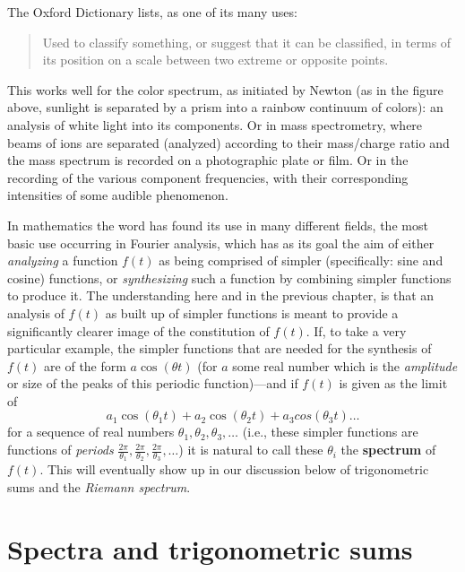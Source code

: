 \documentclass[openany]{book}
\theoremstyle{plain}
\theoremstyle{definition}
\begin{document}
{  The Oxford Dictionary lists, as one of its many uses:

\begin{quote} Used to classify something, or suggest that it can be classified, in terms of its position on a scale between two extreme or opposite points.\end{quote}

This works well for the color spectrum, as initiated by Newton (as in the figure above, sunlight is separated by a prism into a rainbow  continuum of colors): an analysis of white light into its components. Or in mass spectrometry, where
 beams of ions are separated (analyzed) according to their
mass/charge ratio and the mass spectrum is recorded on a photographic plate or film.  Or in the recording of the various component frequencies, with their  corresponding intensities of some audible phenomenon.

 In mathematics the word  has found its use in many different fields, the most basic use occurring in Fourier analysis, which has as its goal the aim of either {\it analyzing}  a function $f(t)$ as being  comprised of simpler (specifically: sine and cosine) functions, or {\it synthesizing} such a function by combining simpler functions to produce it. The understanding here and in the previous chapter, is that  an analysis of $f(t)$ as built up of simpler functions is meant to provide a significantly clearer image of the constitution of $f(t)$.  If, to take a very particular example, the simpler functions  that are needed for the synthesis of $f(t)$ are of the form $a\cos(\theta t)$  (for $a$ some real number which is the {\it amplitude} or size of the peaks of this periodic function)---and  if $f(t)$ is given as the limit of $$a_1\cos(\theta_1t) +  a_2\cos(\theta_2t) + a_3cos(\theta_3t) \dots$$  for a sequence of real numbers $\theta_1, \theta_2,
 \theta_3,
 \dots$  (i.e., these simpler functions are functions of {\it periods} ${\frac{2\pi}{\theta_1}}, {\frac{2\pi}{\theta_2}}, {\frac{2\pi}{\theta_3}}, \dots$) it is natural to call these $\theta_i$ the  {\bf spectrum} of $f(t)$.
   This will eventually show up in our discussion  below of trigonometric sums and the {\it Riemann spectrum}.


 \chapter{Spectra and trigonometric sums \label{sec:trigsums}}

}
\end{document}
